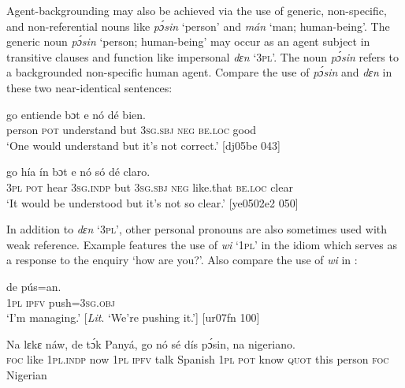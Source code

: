 Agent-backgrounding may also be achieved via the use of generic, non-specific, and non-referential nouns like \textit{pɔ́sin} ‘person’ and \textit{mán} ‘man; human-being’. The generic noun \textit{pɔ́sin} ‘person; human-being’ may occur as an agent subject in transitive clauses and function like impersonal \textit{dɛn} ‘\textsc{3pl}’. The noun \textit{pɔ́sin} refers to a backgrounded non-specific human agent. Compare the use of \textit{pɔ́sin} and \textit{dɛn} in these two near-identical sentences:



\ea%
    \label{ex:key:1348}
    \gll {}  go  entiende    bɔt  e    nó  dé    bien.\\
person  \textsc{pot}  understand  but  \textsc{3sg.sbj}  \textsc{neg}  \textsc{be.loc}  good\\

\glt ‘One would understand but it’s not correct.’ [dj05be 043]
\z


\ea%
    \label{ex:key:1349}
    \gll {}    go  hía    ín    bɔt  e    nó  só    dé    claro.\\
\textsc{3pl}    \textsc{pot}  hear    \textsc{3sg.indp}  but  \textsc{3sg.sbj}  \textsc{neg}  like.that  \textsc{be.loc}  clear\\

\glt ‘It would be understood but it’s not so clear.’ [ye0502e2 050]
\z

In addition to \textit{dɛn} ‘\textsc{3pl}’, other personal pronouns are also sometimes used with weak reference. Example  features the use of \textit{wi} ‘\textsc{1pl}’ in the idiom which serves as a response to the enquiry ‘how are you?’. Also compare the use of \textit{wi} in :


\ea%
    \label{ex:key:1350}
    \gll {}  de  pús=an.\\
\textsc{1pl}  \textsc{ipfv}  push=\textsc{3sg.obj}\\

\glt ‘I’m managing.’ [\textit{Lit}. ‘We’re pushing it.’] [ur07fn 100]
\z


\ea%
    \label{ex:key:1351}
    \gll Na  lɛkɛ        náw,    de  tɔ́k  Panyá,    go
nó    sé    dís  pɔ́sin,  na  nigeriano.\\
\textsc{foc}  like    \textsc{1pl.indp}  now    \textsc{1pl}  \textsc{ipfv}  talk  Spanish  \textsc{1pl}  \textsc{pot}
know  \textsc{quot}    this  person  \textsc{foc}  Nigerian\\

